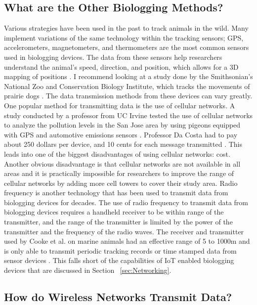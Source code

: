 \documentclass[sigplan,screen,nonacm]{acmart}
\begin{document}
\subsection{What are the Other Biologging Methods?}
\label{subsec:What are the Other Biologging Methods?}

Various strategies have been used in the past to track animals in the wild. Many
implement variations of the same technology within the tracking sensors;
GPS, accelerometers, magnetometers, and thermometers are the most common sensors used in
biologging devices. The data from these sensors help researchers understand
the animal's  speed, direction, and position, which allows for a 3D mapping of
positions \cite{Kidangoor_2024}. I recommend looking at a study done by the Smithsonian's National Zoo and Conservation Biology Institute, which
tracks the movements of prairie dogs \cite{Kidangoor_2024}.
The data transmission methods from these devices can vary greatly. One popular 
method for transmitting data is the use of cellular networks.
A study conducted by a professor from UC Irvine tested the use of cellular
networks to analyze the pollution levels in the San Jose area by using pigeons
equipped with GPS and automotive emissions sensors \cite{Martin_2006}. Professor
Da Costa had to pay about 250 dollars per device, and 10 cents for each message transmitted \cite{Martin_2006}. 
This leads into one of the biggest
disadvantages of using cellular networks: cost. Another obvious disadvantage
is that cellular networks are not available in all areas and it is practically impossible for researchers
to improve the range of cellular networks by adding more cell towers to cover
their study area. \break
Radio frequency is another technology that has been used to
transmit data from biologging devices for decades. The use of radio frequency
to transmit data from biologging devices requires a handheld receiver to be within range
of the transmitter, and the range of the transmitter is limited by the power of
the transmitter and the frequency of the radio waves. The receiver and transmitter
used by Cooke et al. on marine animals had an effective range of 5 to 1000m and 
is only able to transmit periodic tracking records or time stamped data from sensor devices 
\cite{cooke2012biotelemetry}. This falls short of the capabilities of IoT enabled 
biologging devices that are discussed in Section ~\ref{sec:Networking}. 

\subsection{How do Wireless Networks Transmit Data?}
\label{subsec:How do Wireless Networks Transmit Data?}
\end{document}
